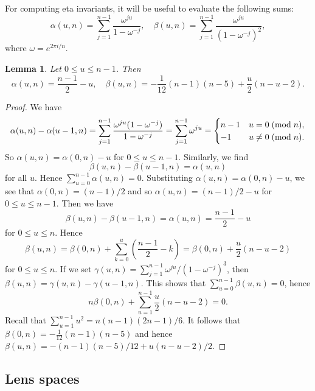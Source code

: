 \documentclass{amsart}
\newtheorem{lemma}[theorem]{Lemma}
\theoremstyle{definition}
\theoremstyle{remark}
\numberwithin{equation}{section}
\begin{document}
For computing eta invariants, it will be useful to evaluate the following sums:
\[
\alpha( u , n ) = \sum_{j=1}^{n-1} \frac{ \omega^{ju} }{1-\omega^{-j}}, \quad \beta( u , n ) = \sum_{j=1}^{n-1} \frac{ \omega^{ju} }{(1-\omega^{-j})^2},
\]
where $\omega = e^{2\pi i/n}$.

\begin{lemma}\label{lem:alphabeta}
Let $0 \le u \le n-1$. Then
\[
\alpha(u,n) = \frac{n-1}{2} - u, \quad \beta(u,n) = -\frac{1}{12}(n-1)(n-5) + \frac{u}{2}(n-u-2).
\]
\end{lemma}
\begin{proof}
We have
\[
\alpha(u,n) - \alpha(u-1,n) =  \sum_{j=1}^{n-1} \frac{ \omega^{ju}(1-\omega^{-j})}{1 - \omega^{-j}} = \sum_{j=1}^{n-1} \omega^{ju} = \begin{cases} n-1 & u=0 \; ({\rm mod} \; n), \\ -1 & u \neq 0 \; ({\rm mod} \; n). \end{cases}
\]
So $\alpha(u,n) = \alpha(0,n) - u$ for $0 \le u \le n-1$. Similarly, we find
\[
\beta(u,n) - \beta(u-1,n) = \alpha(u,n)
\]
for all $u$. Hence $\sum_{u=0}^{n-1} \alpha(u,n) = 0$. Substituting $\alpha(u,n) = \alpha(0,n) - u$, we see that $\alpha(0,n) = (n-1)/2$ and so $\alpha(u,n) = (n-1)/2 - u$ for $0 \le u \le n-1$. Then we have
\[
\beta(u,n) - \beta(u-1,n) = \alpha(u,n) = \frac{n-1}{2} - u
\]
for $0 \le u \le n$. Hence
\[
\beta(u,n) = \beta(0,n) + \sum_{k=0}^{u} \left( \frac{n-1}{2} - k \right) = \beta(0,n) + \frac{u}{2}(n-u-2)
\]
for $0 \le u \le n$. If we set $\gamma(u,n) = \sum_{j=1}^{n-1} \omega^{ju}/(1-\omega^{-j})^3$, then $\beta(u,n) = \gamma(u,n) - \gamma(u-1,n)$. This shows that $\sum_{u=0}^{n-1} \beta(u,n) = 0$, hence
\[
n \beta(0,n) + \sum_{u=1}^{n-1} \frac{u}{2}(n-u-2) = 0.
\]
Recall that $\sum_{u=1}^{n-1} u^2 = n(n-1)(2n-1)/6$. It follows that $\beta(0,n) = -\frac{1}{12}(n-1)(n-5)$ and hence $\beta(u,n) = -(n-1)(n-5)/12 + u(n-u-2)/2$.
\end{proof}




\subsection{Lens spaces}
\end{document}
